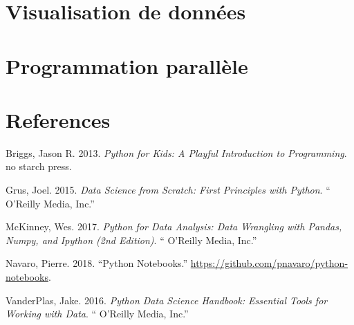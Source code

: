 \documentclass[12pt,]{book}
\numberwithin{equation}{section}
\numberwithin{countremarque}{section}
\begin{document}
\chapter{Visualisation de données}\label{visualisation-de-donnees}

\chapter{Programmation parallèle}\label{programmation-parallele}

\chapter{References}\label{references}

\hypertarget{refs}{}
\hypertarget{ref-briggs_2013_python}{}
Briggs, Jason R. 2013. \emph{Python for Kids: A Playful Introduction to
Programming}. no starch press.

\hypertarget{ref-grus_2015_data}{}
Grus, Joel. 2015. \emph{Data Science from Scratch: First Principles with
Python}. `` O'Reilly Media, Inc.''

\hypertarget{ref-mckinney_2017_python}{}
McKinney, Wes. 2017. \emph{Python for Data Analysis: Data Wrangling with
Pandas, Numpy, and Ipython (2nd Edition)}. `` O'Reilly Media, Inc.''

\hypertarget{ref-navaro_python}{}
Navaro, Pierre. 2018. ``Python Notebooks.''
\url{https://github.com/pnavaro/python-notebooks}.

\hypertarget{ref-vanderplas2016python}{}
VanderPlas, Jake. 2016. \emph{Python Data Science Handbook: Essential
Tools for Working with Data}. `` O'Reilly Media, Inc.''
\end{document}
